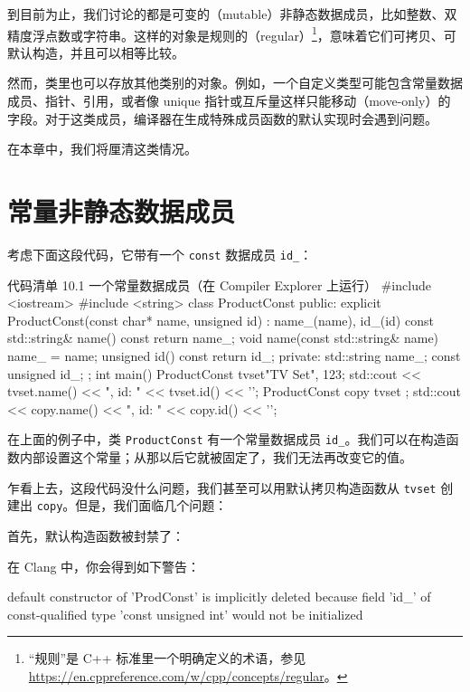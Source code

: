 到目前为止，我们讨论的都是可变的（mutable）非静态数据成员，比如整数、双精度浮点数或字符串。这样的对象是规则的（regular）\footnote{“规则”是 C++ 标准里一个明确定义的术语，参见 \url{https://en.cppreference.com/w/cpp/concepts/regular}。}，意味着它们可拷贝、可默认构造，并且可以相等比较。

然而，类里也可以存放其他类别的对象。例如，一个自定义类型可能包含常量数据成员、指针、引用，或者像 unique 指针或互斥量这样只能移动（move-only）的字段。对于这类成员，编译器在生成特殊成员函数的默认实现时会遇到问题。

在本章中，我们将厘清这类情况。

\section{常量非静态数据成员}

考虑下面这段代码，它带有一个 \texttt{const} 数据成员 \texttt{id\_}：

\begin{codeboxt}[cpp]{代码清单 10.1 一个常量数据成员（在 Compiler Explorer 上运行）}
#include <iostream>
#include <string>
class ProductConst {
public:
explicit ProductConst(const char* name, unsigned id)
: name_(name), id_(id) { }
const std::string& name() const { return name_; }
void name(const std::string& name) { name_ = name; }
unsigned id() const { return id_; }
private:
std::string name_;
const unsigned id_;
};
int main() {
ProductConst tvset{"TV Set", 123};
std::cout << tvset.name() << ", id: " << tvset.id() << '\n';
ProductConst copy { tvset };
std::cout << copy.name() << ", id: " << copy.id() << '\n';
}
\end{codeboxt}

在上面的例子中，类 \texttt{ProductConst} 有一个常量数据成员 \texttt{id\_}。我们可以在构造函数内部设置这个常量；从那以后它就被固定了，我们无法再改变它的值。

乍看上去，这段代码没什么问题，我们甚至可以用默认拷贝构造函数从 \texttt{tvset} 创建出 \texttt{copy}。但是，我们面临几个问题：

首先，默认构造函数被封禁了：

\begin{codebox}[cpp]
class ProdConst {
public:
ProdConst() = default; // warning in clang!
\end{codebox}

在 Clang 中，你会得到如下警告：

\begin{codebox}[cpp]
default constructor of 'ProdConst' is implicitly deleted because field
'id_' of const-qualified type 'const unsigned int' would not be initialized
\end{codebox}

